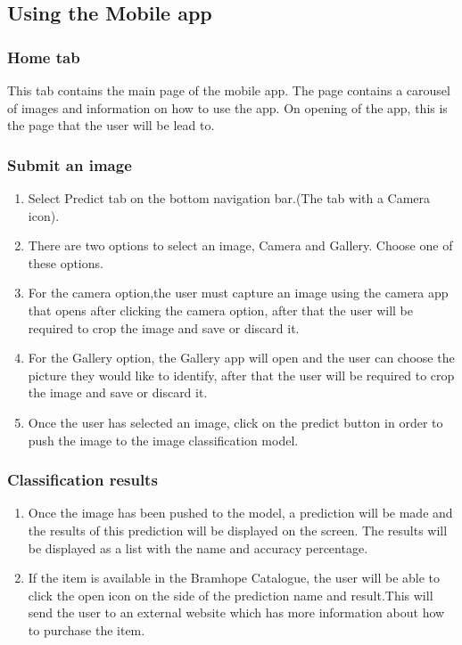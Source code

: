\documentclass[a4paper, 12pt]{article}
\begin{document}
\subsection{Using the Mobile app}

\subsubsection{Home tab}
This tab contains the main page of  the mobile app. The page contains a carousel of images and information on how to use the app. On opening of the app, this is the page that the user will be lead to.

\subsubsection{Submit an image}

\begin{enumerate}
\item Select Predict tab on the bottom navigation bar.(The tab with a Camera icon).
\item There are two options to select an image, Camera and Gallery. Choose one of these options.
\item For the camera option,the user must capture an image using the camera app that opens after clicking the camera option, after that the  user will be required to crop the image and save or discard it.
\item For the Gallery option, the Gallery app will open and the user can choose the picture they would like to identify, after that the  user will be required to crop the image and save or discard it.

\item Once the user has selected an image, click on the predict button in order to push the image to the image classification model.

\end{enumerate}

\subsubsection{Classification results}
\begin{enumerate}
\item Once the image has been pushed to the model, a prediction will be made and the results of this prediction will be displayed on the screen. The results will be displayed as a list with the name and accuracy percentage.
\item If the item is available in the Bramhope Catalogue, the user will be able to click the open icon on the side of the prediction name and result.This will send the user to an external website which has more information about how to purchase the item.
\end{enumerate}
\end{document}
